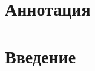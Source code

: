 \documentclass{fefu}
\author{Поликутин Евгений Юрьевич}
\begin{document}
    \section*{Аннотация}
    
    \newpage
    \maketableofcontents
    \section*{Введение}
    
    \newpage
    
    
\end{document}
